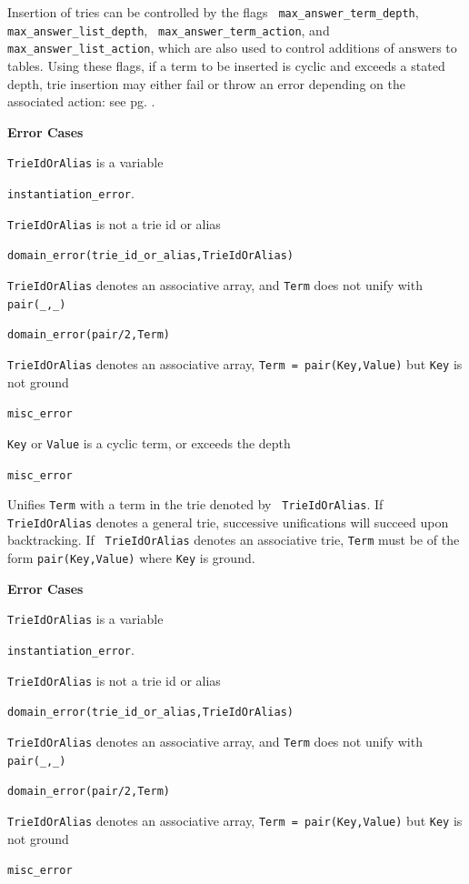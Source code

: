 \begin{description}
Insertion of tries can be controlled by the flags {\tt
  max\_answer\_term\_depth}, {\tt max\_answer\_list\_depth}, {\tt
  max\_answer\_term\_action}, and {\tt max\_answer\_list\_action},
which are also used to control additions of answers to tables.  Using
these flags, if a term to be inserted is cyclic and exceeds a stated
depth, trie insertion may either fail or throw an error depending on
the associated action: see pg. \pageref{prolog-flags}.

{\bf Error Cases}
\bi
\item 	{\tt TrieIdOrAlias} is a variable
\bi
\item 	{\tt instantiation\_error}.
\ei
\item 	{\tt TrieIdOrAlias} is not a trie id or alias
\bi
\item 	{\tt domain\_error(trie\_id\_or\_alias,TrieIdOrAlias)}
\ei
\item 	{\tt TrieIdOrAlias} denotes an associative array, and {\tt Term} 
  does not unify with {\tt pair(\_,\_)} 
\bi
\item 	{\tt domain\_error(pair/2,Term)}
\ei
\item 	{\tt TrieIdOrAlias} denotes an associative array, 
  {\tt Term = pair(Key,Value)} but {\tt Key} is not ground 
\bi
\item 	{\tt misc\_error}
\ei
\item {\tt Key} or {\tt Value} is a cyclic term, or exceeds the depth 
\bi
\item 	{\tt misc\_error}
\ei
\ei
%

%
Unifies {\tt Term} with a term in the trie denoted by {\tt
  TrieIdOrAlias}.  If {\tt TrieIdOrAlias} denotes a general trie,
successive unifications will succeed upon backtracking.  If {\tt
  TrieIdOrAlias} denotes an associative trie, {\tt Term} must be of
the form {\tt pair(Key,Value)} where {\tt Key} is ground.

{\bf Error Cases}
\bi
\item 	{\tt TrieIdOrAlias} is a variable
\bi
\item 	{\tt instantiation\_error}.
\ei
\item 	{\tt TrieIdOrAlias} is not a trie id or alias
\bi
\item 	{\tt domain\_error(trie\_id\_or\_alias,TrieIdOrAlias)}
\ei
\item 	{\tt TrieIdOrAlias} denotes an associative array, and {\tt Term} 
  does not unify with {\tt pair(\_,\_)} 
\bi
\item 	{\tt domain\_error(pair/2,Term)}
\ei
\item {\tt TrieIdOrAlias} denotes an associative array, 
  {\tt Term = pair(Key,Value)} but {\tt Key} is not ground 
\bi
\item 	{\tt misc\_error}
\ei
\ei


\end{description}
